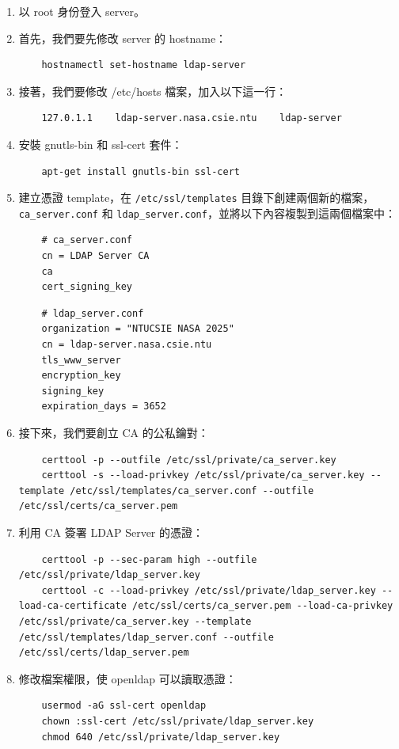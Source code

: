\documentclass[12pt]{article}
\begin{document}
\begin{enumerate}
  \item 以 root 身份登入 server。
  \item 首先，我們要先修改 server 的 hostname：
  \begin{verbatim}
    hostnamectl set-hostname ldap-server
  \end{verbatim}
  \item 接著，我們要修改 /etc/hosts 檔案，加入以下這一行：
  \begin{verbatim}
    127.0.1.1    ldap-server.nasa.csie.ntu    ldap-server
  \end{verbatim}
  \item 安裝 gnutls-bin 和 ssl-cert 套件：
  \begin{verbatim}
    apt-get install gnutls-bin ssl-cert
  \end{verbatim}
  \item 建立憑證 template，在 \texttt{/etc/ssl/templates} 目錄下創建兩個新的檔案，\texttt{ca\_server.conf} 和 \texttt{ldap\_server.conf}，並將以下內容複製到這兩個檔案中：
  \begin{verbatim}
    # ca_server.conf
    cn = LDAP Server CA
    ca
    cert_signing_key
  \end{verbatim}
  \vspace{-0.5cm}
  \begin{verbatim}
    # ldap_server.conf
    organization = "NTUCSIE NASA 2025"
    cn = ldap-server.nasa.csie.ntu
    tls_www_server
    encryption_key
    signing_key
    expiration_days = 3652
  \end{verbatim}
  \clearpage
  \item 接下來，我們要創立 CA 的公私鑰對：
  \begin{verbatim}
    certtool -p --outfile /etc/ssl/private/ca_server.key
    certtool -s --load-privkey /etc/ssl/private/ca_server.key --template /etc/ssl/templates/ca_server.conf --outfile /etc/ssl/certs/ca_server.pem
  \end{verbatim}
  \item 利用 CA 簽署 LDAP Server 的憑證：
  \begin{verbatim}
    certtool -p --sec-param high --outfile /etc/ssl/private/ldap_server.key
    certtool -c --load-privkey /etc/ssl/private/ldap_server.key --load-ca-certificate /etc/ssl/certs/ca_server.pem --load-ca-privkey /etc/ssl/private/ca_server.key --template /etc/ssl/templates/ldap_server.conf --outfile /etc/ssl/certs/ldap_server.pem
  \end{verbatim}
  \item 修改檔案權限，使 openldap 可以讀取憑證：
  \begin{verbatim}
    usermod -aG ssl-cert openldap
    chown :ssl-cert /etc/ssl/private/ldap_server.key
    chmod 640 /etc/ssl/private/ldap_server.key
  \end{verbatim}


\end{enumerate}
\end{document}
